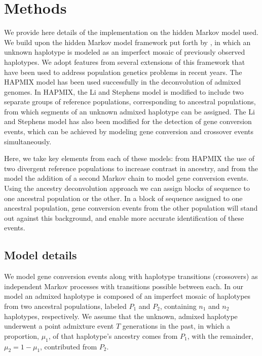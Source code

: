 \section{Methods}


We provide here details of the implementation on the hidden Markov model used.
We build upon the hidden Markov model framework put forth by \citet{Li2003}, in which an unknown haplotype is modeled as an imperfect mosaic of previously observed haplotypes.
We adopt features from several extensions of this framework that have been used to address population genetics problems in recent years.
The HAPMIX model\cite{Price2009} has been used successfully in the deconvolution of admixed genomes.
In HAPMIX, the Li and Stephens model is modified to include two separate groups of reference populations, corresponding to ancestral populations, from which segments of an unknown admixed haplotype can be assigned.
The Li and Stephens model has also been modified for the detection of gene conversion events, which can be achieved by modeling gene conversion and crossover events simultaneously\citep{Gay2007}.

Here, we take key elements from each of these models: from HAPMIX the use of two divergent reference populations to increase contrast in ancestry, and from the \citet{Gay2007} model the addition of a second Markov chain to model gene conversion events.
Using the ancestry deconvolution approach we can assign blocks of sequence to one ancestral population or the other.
In a block of sequence assigned to one ancestral population, gene conversion events from the other population will stand out against this background, and enable more accurate identification of these events.

\subsection{Model details}
We model gene conversion events along with haplotype transitions (crossovers) as independent Markov processes with transitions possible between each.
In our model an admixed haplotype is composed of an imperfect mosaic of haplotypes from two ancestral populations, labeled $P_1$ and $P_2$, containing $n_1$ and $n_2$ haplotypes, respectively.
We assume that the unknown, admixed haplotype underwent a point admixture event $T$ generations in the past,
in which a proportion, $\mu_1$, of that haplotype's ancestry comes from $P_1$, with the remainder, $\mu_2 = 1-\mu_1$, contributed from $P_2$.

